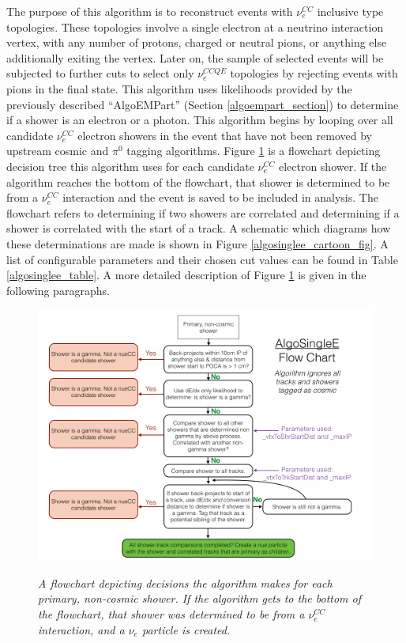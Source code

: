 The purpose of this algorithm is to reconstruct events with $\nu_e^{CC}$ inclusive type topologies. These topologies involve a single electron at a neutrino interaction vertex, with any number of protons, charged or neutral pions, or anything else additionally exiting the vertex. Later on, the sample of selected events will be subjected to further cuts to select only $\nu_e^{CCQE}$ topologies by rejecting events with pions in the final state. This algorithm uses likelihoods provided by the previously described ``AlgoEMPart'' (Section \ref{algoempart_section}) to determine if a shower is an electron or a photon. This algorithm begins by looping over all candidate $\nu_e^{CC}$ electron showers in the event that have not been removed by upstream cosmic and $\pi^0$ tagging algorithms. Figure \ref{algosinglee_flowchart_fig} is a flowchart depicting decision tree this algorithm uses for each candidate $\nu_e^{CC}$ electron shower. If the algorithm reaches the bottom of the flowchart, that shower is determined to be from a $\nu_e^{CC}$ interaction and the event is saved to be included in analysis. The flowchart refers to determining if two showers are correlated and determining if a shower is correlated with the start of a track. A schematic which diagrams how these determinations are made is shown in Figure \ref{algosinglee_cartoon_fig}. A list of configurable parameters and their chosen cut values can be found in Table \ref{algosinglee_table}. A more detailed description of Figure \ref{algosinglee_flowchart_fig} is given in the following paragraphs.\\


\begin{figure}[ht!]
\centering
\includegraphics[width=150mm]{Figures/algosinglee_flowchart.png}\\
\caption{\textit{A flowchart depicting decisions the algorithm makes for each primary, non-cosmic shower. If the algorithm gets to the bottom of the flowchart, that shower was determined to be from a $\nu_e^{CC}$ interaction, and a $\nu_e$ particle is created.}}
\label{algosinglee_flowchart_fig}
\end{figure}

